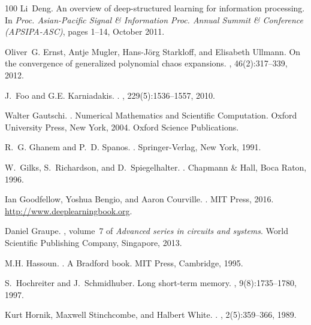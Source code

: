 \documentclass[a4paper,fleqn]{article}
\begin{document}
\begin{thebibliography}{100}
Li~Deng.
\newblock An overview of deep-structured learning for information processing.
\newblock In {\em Proc. Asian-Pacific Signal \& Information Proc. Annual Summit
  \& Conference (APSIPA-ASC)}, pages 1--14, October 2011.

Oliver~G. Ernst, Antje Mugler, Hans-J\"org Starkloff, and Elisabeth Ullmann.
\newblock On the convergence of generalized polynomial chaos expansions.
, 46(2):317--339, 2012.

J.~Foo and G.E. Karniadakis.
.
, 229(5):1536--1557, 2010.

Walter Gautschi.
.
\newblock Numerical Mathematics and Scientific Computation. Oxford University
  Press, New York, 2004.
\newblock Oxford Science Publications.

R.~G. Ghanem and P.~D. Spanos.
.
\newblock Springer-Verlag, New York, 1991.

W.~Gilks, S.~Richardson, and D.~Spiegelhalter.
.
\newblock Chapmann {\&} Hall, Boca Raton, 1996.

Ian Goodfellow, Yoshua Bengio, and Aaron Courville.
.
\newblock MIT Press, 2016.
\newblock \url{http://www.deeplearningbook.org}.

Daniel Graupe.
, volume~7 of {\em
  Advanced series in circuits and systems}.
\newblock World Scientific Publishing Company, Singapore, 2013.

M.H. Hassoun.
.
\newblock A Bradford book. MIT Press, Cambridge, 1995.

S.~Hochreiter and J.~Schmidhuber.
\newblock Long short-term memory.
, 9(8):1735--1780, 1997.

Kurt Hornik, Maxwell Stinchcombe, and Halbert White.
.
, 2(5):359--366, 1989.


\end{thebibliography}
\end{document}
